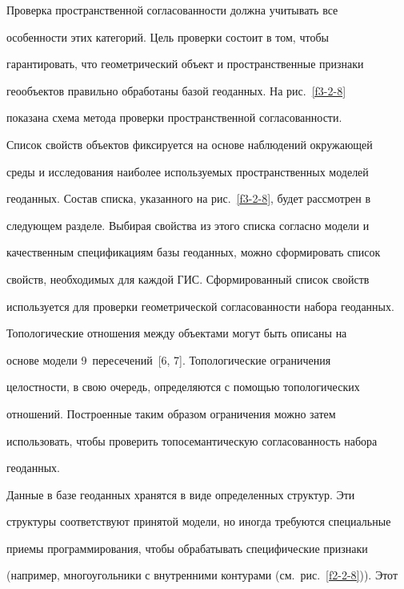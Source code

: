     Проверка пространственной согласованности должна учитывать все 


особенности этих категорий. Цель проверки состоит в том, чтобы 


гарантировать, что геометрический объект и пространственные признаки 


геообъектов правильно обработаны базой геоданных. На рис.~\ref{f3-2-8} 


показана схема метода проверки пространственной согласованности. 








    Список свойств объектов фиксируется на основе наблюдений окружающей 


среды и исследования наиболее используемых пространственных моделей 


геоданных. Состав списка, указанного на рис.~\ref{f3-2-8}, будет рассмотрен в 


следующем разделе. Выбирая свойства из этого списка согласно модели и 


качественным спецификациям базы геоданных, можно сформировать список 


свойств, необходимых для каждой ГИС. Сформированный список свойств 


используется для проверки геометрической согласованности набора геоданных. 


    


    Топологические отношения между объектами могут быть описаны на 


основе модели 9~пересечений~[6, 7]. Топологические ограничения 


целостности, в свою очередь, определяются с помощью топологических 


отношений. Построенные таким образом ограничения можно затем 


использовать, чтобы проверить топосемантическую согласованность набора 


геоданных. 


    


    Данные в базе геоданных хранятся в виде определенных структур. Эти 


структуры соответствуют принятой модели, но иногда требуются специальные 


приемы программирования, чтобы обрабатывать специфические признаки 


(например, многоугольники с внутренними контурами (см.\ рис.~\ref{f2-2-8})). Этот 


